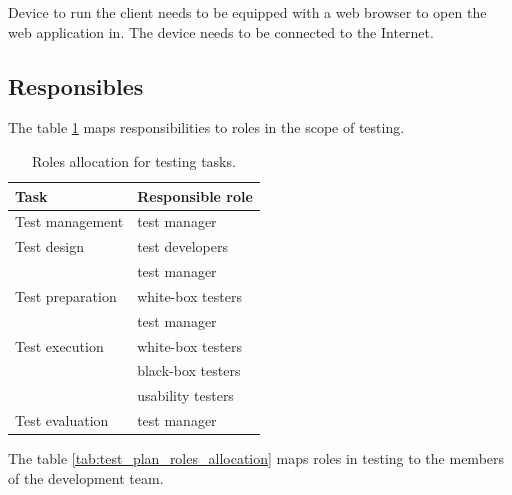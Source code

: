 \documentclass[11pt]{book}
\begin{document}
Device to run the client needs to be equipped with a web browser to open the web application in. The device needs to be connected to the Internet.

\subsection{Responsibles}

The table \ref{tab:test_plan_tasks_allocation} maps responsibilities to roles in the scope of testing.

\begin{table}[H]
	\centering
	\begin{tabular}{| l | l |}
		\hline
		Task 				& Responsible role \\ \hline

		Test management 	& test manager \\ \hline
		
		Test design 		& test developers \\
							& test manager \\ \hline
		
		Test preparation 	& white-box testers \\
							& test manager \\ \hline
		
		Test execution 		& white-box testers \\
							& black-box testers \\
							& usability testers \\ \hline
		
		Test evaluation 	& test manager \\ \hline
	\end{tabular}
	\label{tab:test_plan_tasks_allocation}
	\caption{Roles allocation for testing tasks.}
\end{table}

The table \ref{tab:test_plan_roles_allocation} maps roles in testing to the members of the development team.
\end{document}
